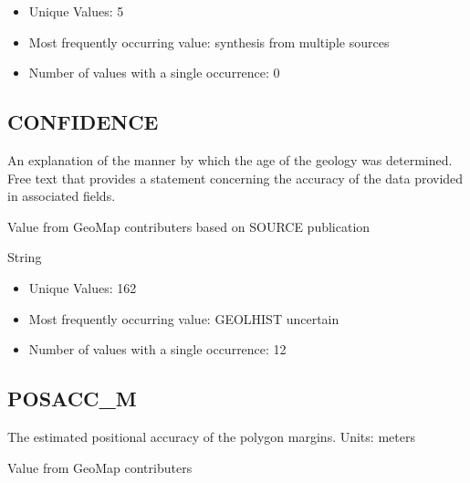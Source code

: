 \documentclass[letterpaper,10pt,english]{sphinxmanual}
\begin{document}

\begin{itemize}
\item {} 
Unique Values: 5

\item {} 
Most frequently occurring value: synthesis from multiple sources

\item {} 
Number of values with a single occurrence: 0

\end{itemize}


\subsection{CONFIDENCE}
\label{\detokenize{field_glossary:confidence}}
An explanation of the manner by which the age of the geology was determined. Free text that provides a statement concerning the accuracy of the data provided in associated fields.

Value from GeoMap contributers based on SOURCE publication

String


\begin{itemize}
\item {} 
Unique Values: 162

\item {} 
Most frequently occurring value: GEOLHIST uncertain

\item {} 
Number of values with a single occurrence: 12

\end{itemize}


\subsection{POSACC\_M}
\label{\detokenize{field_glossary:posacc-m}}
The estimated positional accuracy of the polygon margins. Units: meters

Value from GeoMap contributers
\end{document}

